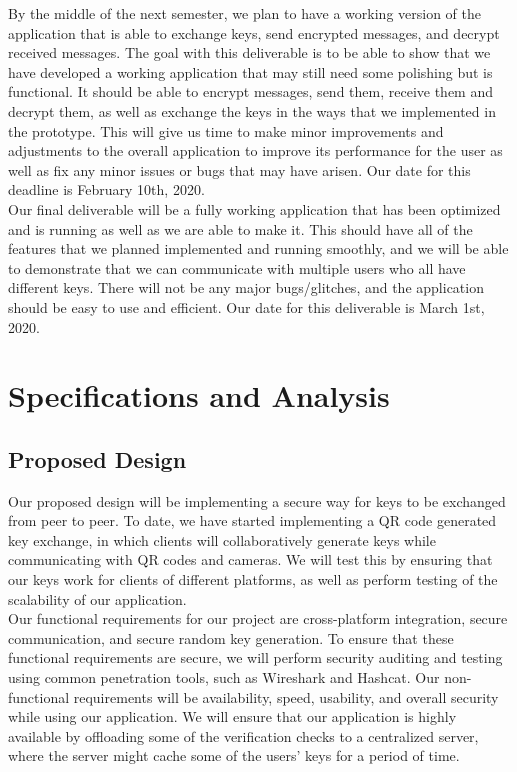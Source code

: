 \documentclass[11pt]{article}
\begin{document}
By the middle of the next semester, we plan to have a working version of the application that is able to exchange keys, send encrypted messages, and decrypt received messages. The goal with this deliverable is to be able to show that we have developed a working application that may still need some polishing but is functional. It should be able to encrypt messages, send them, receive them and decrypt them, as well as exchange the keys in the ways that we implemented in the prototype. This will give us time to make minor improvements and adjustments to the overall application to improve its performance for the user as well as fix any minor issues or bugs that may have arisen. Our date for this deadline is February 10th, 2020.\\

Our final deliverable will be a fully working application that has been optimized and is running as well as we are able to make it. This should have all of the features that we planned implemented and running smoothly, and we will be able to demonstrate that we can communicate with multiple users who all have different keys. There will not be any major bugs/glitches, and the application should be easy to use and efficient. Our date for this deliverable is March 1st, 2020.



\newpage
\section{Specifications and Analysis}
\subsection{Proposed Design}
Our proposed design will be implementing a secure way for keys to be exchanged from peer to peer. To date, we have started implementing a QR code generated key exchange, in which clients will collaboratively generate keys while communicating with QR codes and cameras. We will test this by ensuring that our keys work for clients of different platforms, as well as perform testing of the scalability of our application.\\

    Our functional requirements for our project are cross-platform integration, secure communication, and secure random key generation. To ensure that these functional requirements are secure, we will perform security auditing and testing using common penetration tools, such as Wireshark and Hashcat. Our non-functional requirements will be availability, speed, usability, and overall security while using our application. We will ensure that our application is highly available by offloading some of the verification checks to a centralized server, where the server might cache some of the users’ keys for a period of time. \\
 
\end{document}

